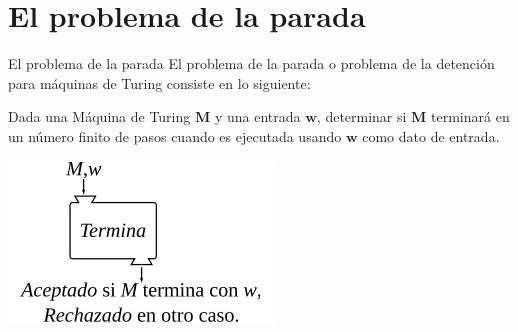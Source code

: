 \documentclass{beamer}
\begin{document}
\section{El problema de la parada}
\begin{frame}{El problema de la parada}
El problema de la parada o problema de la detención para máquinas de Turing consiste en lo siguiente:\\\pause
\begin{center}
    Dada una Máquina de Turing $\mathbf{M}$ y una entrada $\mathbf{w}$, determinar si $\mathbf{M}$ terminará en un número finito de pasos cuando es ejecutada usando $\mathbf{w}$ como dato de entrada.
\end{center}
\pause
\begin{center}
        \includegraphics[scale=0.5]{problema0.png}
    \end{center}
\end{frame}
\end{document}
